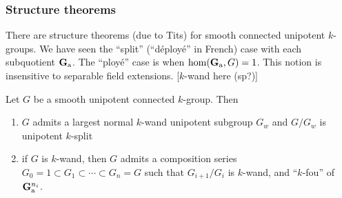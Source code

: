 \subsubsection{Structure theorems}

There are structure theorems (due to Tits) for smooth connected unipotent 
$k$-groups. We have seen the ``split'' (``d\'eploy\'e'' in French) case with 
each subquotient $\mathbf{G}_{\mathrm{a}}$. The ``ploy\'e'' case is when 
$\hom(\mathbf{G}_{\mathrm{a}},G)=1$. This notion is insensitive to separable field 
extensions. [$k$-wand here (sp?)]

\begin{theo}[Tits]
Let $G$ be a smooth unipotent connected $k$-group. Then 
\begin{enumerate}
  \item $G$ admits a largest normal $k$-wand unipotent subgroup $G_w$ 
    and $G/G_w$ is unipotent $k$-split
  \item if $G$ is $k$-wand, then $G$ admits a composition series 
    $G_0=1\subset G_1\subset \cdots \subset G_n=G$ such that 
      $G_{i+1}/G_i$ is $k$-wand, and ``$k$-fou'' of $\mathbf{G}_{\mathrm{a}}^{n_i}$. 
\end{enumerate}
\end{theo}





